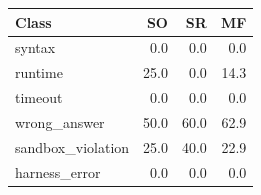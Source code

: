 \begin{tabular}{@{}lrrr@{}}
\toprule
Class & SO & SR & MF \\
\midrule
syntax & 0.0 & 0.0 & 0.0 \\
runtime & 25.0 & 0.0 & 14.3 \\
timeout & 0.0 & 0.0 & 0.0 \\
wrong\_answer & 50.0 & 60.0 & 62.9 \\
sandbox\_violation & 25.0 & 40.0 & 22.9 \\
harness\_error & 0.0 & 0.0 & 0.0 \\
\bottomrule
\end{tabular}
